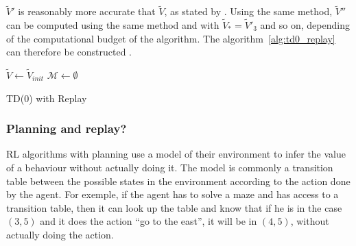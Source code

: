 \documentclass[]{article}
\begin{document}
\(\tilde{V}'\) is reasonably more accurate that \(\tilde{V}\), as stated by \textcite{vanseijen_deeper_2015}. Using the same method, \(\tilde{V}''\) can be computed using the same method and with \(\tilde{V}_* = \tilde{V}'_3\) and so on, depending of the computational budget of the algorithm. The algorithm~\ref{alg:td0_replay} can therefore be constructed \parencite{vanseijen_deeper_2015}.

\begin{algorithm}[htbp]
  \DontPrintSemicolon
  \SetAlgoNoLine
  \(\tilde{V} \gets \tilde{V}_{init}\)\;
  \(\mathcal{M} \gets \emptyset\) 
  \caption{TD(0) with Replay \label{alg:td0_replay}}

\end{algorithm}

\subsubsection{Planning and replay?}
\label{subs:Planning and replay}

RL algorithms with planning use a model of their environment to infer the value  of a behaviour without actually doing it. The model is commonly a transition table between the possible states in the environment according to the action done by the agent. For exemple, if the agent has to solve a maze and has access to a transition table, then it can look up the table and know that if he is in the case \((3, 5)\) and it does the action ``go to the east'', it will be in \((4, 5)\), without actually doing the action.
\end{document}
